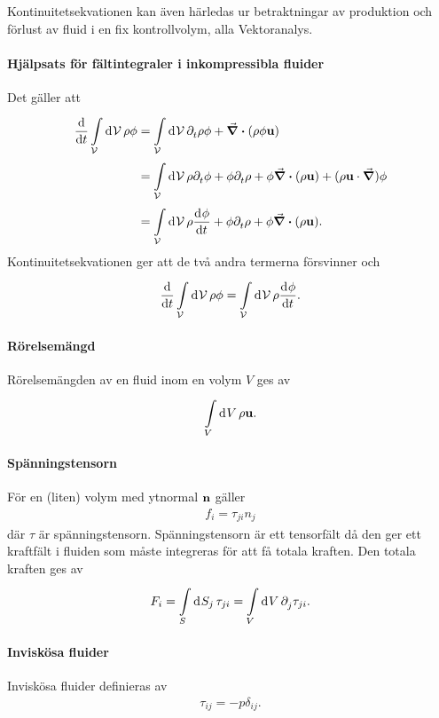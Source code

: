 Kontinuitetsekvationen kan även härledas ur betraktningar av produktion och förlust av fluid i en fix kontrollvolym, alla Vektoranalys.

\paragraph{Hjälpsats för fältintegraler i inkompressibla fluider}
Det gäller att
\begin{align*}
	\dv{t}\int\limits_{\mathcal{V}}^{}\dd[]{\mathcal{V}}\rho\phi &= \int\limits_{\mathcal{V}}^{}\dd[]{\mathcal{V}}\partial_{t}^{}\rho\phi + \div(\rho\phi\vb{u}) \\
	                                               &= \int\limits_{\mathcal{V}}^{}\dd[]{\mathcal{V}}\rho\partial_{t}^{}\phi + \phi\partial_{t}^{}\rho + \phi\div(\rho\vb{u}) + (\rho\vb{u}\cdot\grad)\phi \\
	                                               &= \int\limits_{\mathcal{V}}^{}\dd[]{\mathcal{V}}\rho\dv[]{\phi}{t} + \phi\partial_{t}^{}\rho + \phi\div(\rho\vb{u}).
\end{align*}
Kontinuitetsekvationen ger att de två andra termerna försvinner och
\begin{align*}
	\dv{t}\int\limits_{\mathcal{V}}^{}\dd[]{\mathcal{V}}\rho\phi =\int\limits_{\mathcal{V}}^{}\dd[]{\mathcal{V}}\rho\dv[]{\phi}{t}.
\end{align*}

\paragraph{Rörelsemängd}
Rörelsemängden av en fluid inom en volym $V$ ges av
\begin{align*}
	\int\limits_{V}^{}\dd[]{V}\rho\vb{u}.
\end{align*}

\paragraph{Spänningstensorn}
För en (liten) volym med ytnormal $\vb{n}$ gäller
\begin{align*}
	f_{i} = \tau_{ji}n_{j}
\end{align*}
där $\tau$ är spänningstensorn. Spänningstensorn är ett tensorfält då den ger ett kraftfält i fluiden som måste integreras för att få totala kraften. Den totala kraften ges av
\begin{align*}
	F_{i} = \int\limits_{S}^{}\dd[]{S_{j}}\tau_{ji} = \int\limits_{V}^{}\dd[]{V}\partial_{j}^{}\tau_{ji}.
\end{align*}

\paragraph{Inviskösa fluider}
Inviskösa fluider definieras av
\begin{align*}
	\tau_{ij} = -p\delta_{ij}.
\end{align*}

